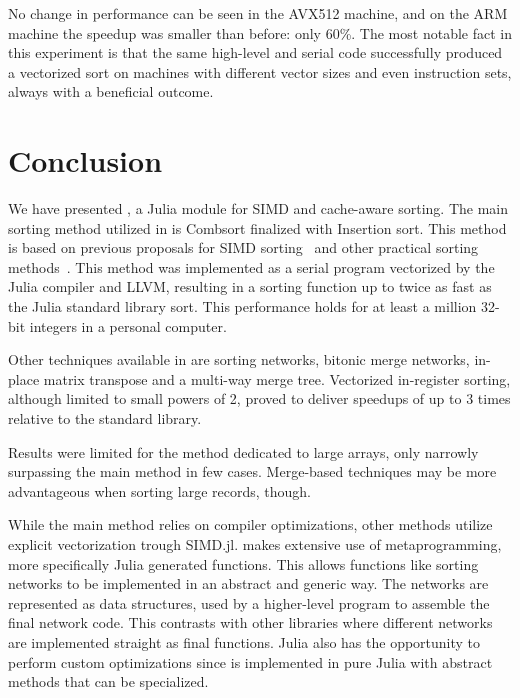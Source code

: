 \documentclass{juliacon}
\begin{document}
No change in performance can be seen in the AVX512 machine, and on the ARM machine the speedup was smaller than before: only 60\%. The most notable fact in this experiment is that the same high-level and serial code successfully produced a vectorized sort on machines with different vector sizes and even instruction sets, always with a beneficial outcome.

\section{Conclusion}
\label{sec:conclusion}
%
We have presented \chipsort, a Julia module for SIMD and cache-aware sorting. The main sorting method utilized in \chipsort is Combsort finalized with Insertion sort. This method is based on previous proposals for SIMD sorting~\cite{DBLP:conf/IEEEpact/InoueMKN07,DBLP:journals/pvldb/InoueT15} and other practical sorting methods~\cite{INCERPI198737,musser1997introspective}. This method was implemented as a serial program vectorized by the Julia compiler and LLVM, resulting in a sorting function up to twice as fast as the Julia standard library sort. This performance holds for at least a million 32-bit integers in a personal computer.

Other techniques available in \chipsort are sorting networks, bitonic merge networks, in-place matrix transpose and a multi-way merge tree. Vectorized in-register sorting, although limited to small powers of 2, proved to deliver speedups of up to 3 times relative to the standard library.

Results were limited for the method dedicated to large arrays, only narrowly surpassing the main \chipsort method in few cases. Merge-based techniques may be more advantageous when sorting large records, though.

While the main \chipsort method relies on compiler optimizations, other methods utilize explicit vectorization trough SIMD.jl. \chipsort makes extensive use of metaprogramming, more specifically Julia generated functions. This allows functions like sorting networks to be implemented in an abstract and generic way. The networks are represented as data structures, used by a higher-level program to assemble the final network code. This contrasts with other libraries where different networks are implemented straight as final functions. Julia also has the opportunity to perform custom optimizations since \chipsort is implemented in pure Julia with abstract methods that can be specialized.
\end{document}
